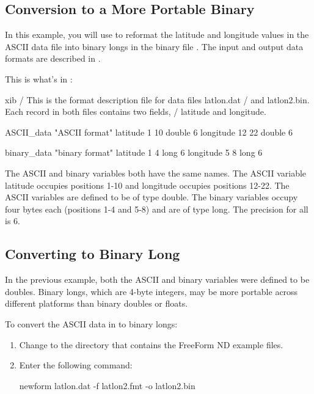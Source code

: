 \subsection{Conversion to a More Portable Binary}

In this example, you will use  to reformat the latitude
and longitude values in the ASCII data file  into
binary longs in the binary file . The input and
output data formats are described in .

This is what's in :
\nopagebreak
\begin{vcode}{xib}
/ This is the format description file for data files latlon.dat
/ and latlon2.bin. Each record in both files contains two fields, 
/ latitude and longitude.

ASCII_data "ASCII format"
latitude 1 10 double 6
longitude 12 22 double 6

binary_data "binary format"
latitude 1 4 long 6
longitude 5 8 long 6
\end{vcode}

The ASCII and binary variables both have the same names. The ASCII
variable latitude occupies positions 1-10 and longitude occupies
positions 12-22. The ASCII variables are defined to be of type double.
The binary variables occupy four bytes each (positions 1-4 and 5-8)
and are of type long. The precision for all is 6.

\subsection{Converting to Binary Long}

In the previous example, both the ASCII and binary variables were
defined to be doubles. Binary longs, which are 4-byte integers, may be
more portable across different platforms than binary doubles or
floats.

To convert the ASCII data in  to binary longs: 

\begin{enumerate}
\item Change to the directory that contains the FreeForm ND example
  files.

\item Enter the following command: 

\begin{example}
newform latlon.dat -f latlon2.fmt -o latlon2.bin 
\end{example}
\end{enumerate}

